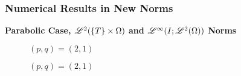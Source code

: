 \begin{frame}
    \frametitle{Numerical Results in New Norms}

    \vspace*{\fill}
    \begin{center}
        {\color{\accentcolor} \Large \textbf{Parabolic Case, $\mathscr{L}^{2}(\left\{ T \right\} \times \Omega)$ and $\mathscr{L}^{\infty}(I; \mathscr{L}^{2}(\Omega))$ Norms}}
    \end{center}

    \vspace*{\fill}

    \begin{multicols}{2}

        \begin{center}
            \begin{minipage}{0.4\textwidth}
                \begin{figure}[!ht]
                    \caption{$\left( p, q  \right) = \left( 2, 1  \right)$}
                    \label{fig:p_2_1_par_l2T}
                    
                \end{figure}
            \end{minipage}
        \end{center}

        \vfill\null
        \columnbreak

        \begin{center}
            \begin{minipage}{0.4\textwidth}
                \begin{figure}[!ht]
                    \caption{$\left( p, q  \right) = \left( 2, 1  \right)$}
                    \label{fig:p_2_1_par_linfl2}
                    
                \end{figure}
            \end{minipage}
        \end{center}

    \end{multicols}
    \vspace*{\fill}
    
\end{frame}

